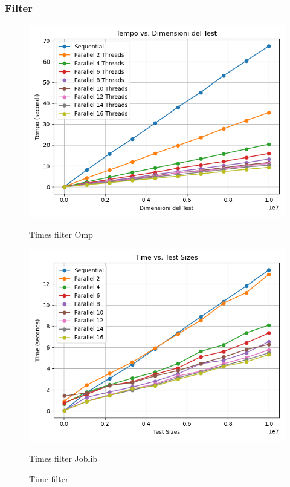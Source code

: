 \documentclass[11pt]{article}
\begin{document}
    \subsubsection{Filter}\label{subsubsec:filter}
    \begin{figure}[H]
        \centering
        \includegraphics[width=\linewidth]{omp/001/filter_time_plot}
            \caption{Times filter Omp}\label{fig:filter_time_omp}
        \endminipage\hfill
        \includegraphics[width=\linewidth]{joblib/001/filter_time_plot}
            \caption{Times filter Joblib}\label{fig:filter_time_joblib}
        \endminipage\hfill
        \caption{Time filter}
    \end{figure}
\end{document}
